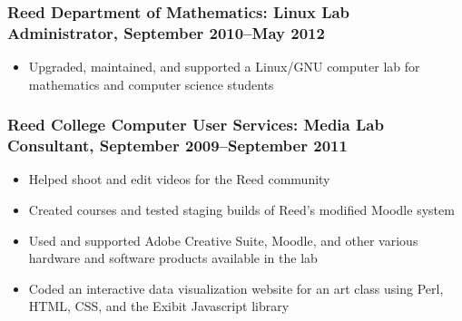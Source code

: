 \documentclass[letterpaper]{article}
\begin{document}
\subsubsection*{Reed Department of Mathematics: \textbf{Linux Lab Administrator}, September 2010--May 2012}
	\begin{itemize}
	   \item Upgraded, maintained, and supported a Linux/GNU computer lab for mathematics and computer science students
	\end{itemize}
\subsubsection*{Reed College Computer User Services: \textbf{Media Lab Consultant}, September 2009--September 2011}
	\begin{itemize}
    	\item Helped shoot and edit videos for the Reed community
    	\item Created courses and tested staging builds of Reed's modified Moodle system 
    	\item Used and supported Adobe Creative Suite, Moodle, and other various hardware and software products available in the lab
    	\item Coded an interactive data visualization website for an art class using Perl, HTML, CSS, and the Exibit Javascript library
    \end{itemize}





\end{document}
